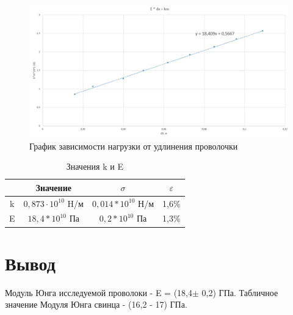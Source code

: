 \documentclass[a4paper,14pt]{extarticle}
\begin{document}
	\begin{figure}[H]
		\begin{center}
			\includegraphics[scale = 0.5]{"pohui.jpg"}
			\caption{График зависимости нагрузки от удлинения проволочки}
		\end{center}
	\end{figure}
	\begin{table}[!ht]
		\centering
		\begin{tabular}{|c|c|c|c|}
			\hline
			&Значение&$\sigma$&$\varepsilon$\\
			\hline
			k&$0,873\cdot 10^{10}$ H/м&$0,014 * 10^{10}$ Н/м&1,6\%\\
			\hline
			E&$18,4*10^{10}$ Па&$ 0,2*10^{10}$ Па& 1,3\%\\
			\hline
		\end{tabular}
	\caption{Значения k и E}
	\end{table}
\section{Вывод}
	Модуль Юнга исследуемой проволоки - E = (18,4$\pm$ 0,2) ГПа. Табличное значение Модуля Юнга свинца - (16,2 - 17) ГПа.  
\end{document}
